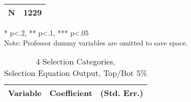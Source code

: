 \begin{sidewaystable}[htb]
\begin{threeparttable}
\begin{tabular}{l|c|c|c|c|c|c}
      \hline
      N        &         \multicolumn{6}{|c}{1229}                            \\
      \hline
      \hline
    \end{tabular}
    \begin{tablenotes}
    \item{* p<.2, ** p<.1, *** p<.05 \\ Note: Professor dummy variables are omitted to save space.}
    \end{tablenotes}
  \end{threeparttable}
\end{sidewaystable}

\clearpage{}


\newpage{}

\begin{table}[H]\centering
  \begin{threeparttable}
    \caption{4 Selection Categories, \\Selection Equation Output, Top/Bot 5\%}\label{table:b10}
    \begin{tabular}{l c c}
      \hline\hline 
      \multicolumn{1}{c}{\textbf{Variable}} & {\textbf{Coefficient}} & \textbf{(Std. Err.)} \\ 
      \hline
      \hline 


\end{tabular}
\end{threeparttable}
\end{table}
